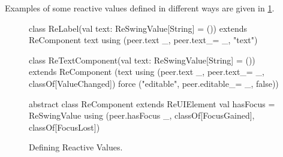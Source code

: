 \documentclass{scrartcl}
\begin{document}
Examples of some reactive values defined in different ways are given
in \ref{lst:defining-reactive-values}.

\begin{figure}
\begin{codenv}
class ReLabel(val text: ReSwingValue[String] = ()) 
                             extends ReComponent {
  text using (peer.text _, peer.text_= _, "text")
}

class ReTextComponent(val text: ReSwingValue[String] = ()) 
                            extends ReComponent {
  (text using (peer.text _, peer.text_= _, classOf[ValueChanged])
        force ("editable", peer.editable_= _, false))
}

abstract class ReComponent extends ReUIElement {
  val hasFocus = ReSwingValue using (peer.hasFocus _, classOf[FocusGained],
                                                      classOf[FocusLost])
}
\end{codenv}
\caption{Defining Reactive Values.}
\label{lst:defining-reactive-values}
\vspace{-4mm}
\end{figure}
\end{document}

